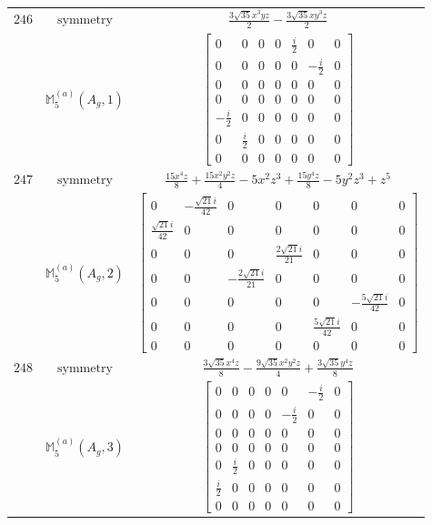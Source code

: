 \documentclass[fleqn,8pt,landscape]{jsarticle}
\begin{document}
\begin{longtable}{ccc}
$ 246 $ & $ \text{symmetry} $ & $ \frac{3 \sqrt{35} x^{3} y z}{2} - \frac{3 \sqrt{35} x y^{3} z}{2} $ \\
$  $ & $ \mathbb{M}_{5}^{(a)}(A_{g},1) $ & $ \begin{bmatrix} 0 & 0 & 0 & 0 & \frac{i}{2} & 0 & 0 \\ 0 & 0 & 0 & 0 & 0 & - \frac{i}{2} & 0 \\ 0 & 0 & 0 & 0 & 0 & 0 & 0 \\ 0 & 0 & 0 & 0 & 0 & 0 & 0 \\ - \frac{i}{2} & 0 & 0 & 0 & 0 & 0 & 0 \\ 0 & \frac{i}{2} & 0 & 0 & 0 & 0 & 0 \\ 0 & 0 & 0 & 0 & 0 & 0 & 0 \end{bmatrix} $ \\ \hline
$ 247 $ & $ \text{symmetry} $ & $ \frac{15 x^{4} z}{8} + \frac{15 x^{2} y^{2} z}{4} - 5 x^{2} z^{3} + \frac{15 y^{4} z}{8} - 5 y^{2} z^{3} + z^{5} $ \\
$  $ & $ \mathbb{M}_{5}^{(a)}(A_{g},2) $ & $ \begin{bmatrix} 0 & - \frac{\sqrt{21} i}{42} & 0 & 0 & 0 & 0 & 0 \\ \frac{\sqrt{21} i}{42} & 0 & 0 & 0 & 0 & 0 & 0 \\ 0 & 0 & 0 & \frac{2 \sqrt{21} i}{21} & 0 & 0 & 0 \\ 0 & 0 & - \frac{2 \sqrt{21} i}{21} & 0 & 0 & 0 & 0 \\ 0 & 0 & 0 & 0 & 0 & - \frac{5 \sqrt{21} i}{42} & 0 \\ 0 & 0 & 0 & 0 & \frac{5 \sqrt{21} i}{42} & 0 & 0 \\ 0 & 0 & 0 & 0 & 0 & 0 & 0 \end{bmatrix} $ \\ \hline
$ 248 $ & $ \text{symmetry} $ & $ \frac{3 \sqrt{35} x^{4} z}{8} - \frac{9 \sqrt{35} x^{2} y^{2} z}{4} + \frac{3 \sqrt{35} y^{4} z}{8} $ \\
$  $ & $ \mathbb{M}_{5}^{(a)}(A_{g},3) $ & $ \begin{bmatrix} 0 & 0 & 0 & 0 & 0 & - \frac{i}{2} & 0 \\ 0 & 0 & 0 & 0 & - \frac{i}{2} & 0 & 0 \\ 0 & 0 & 0 & 0 & 0 & 0 & 0 \\ 0 & 0 & 0 & 0 & 0 & 0 & 0 \\ 0 & \frac{i}{2} & 0 & 0 & 0 & 0 & 0 \\ \frac{i}{2} & 0 & 0 & 0 & 0 & 0 & 0 \\ 0 & 0 & 0 & 0 & 0 & 0 & 0 \end{bmatrix} $ \\ \hline

\end{longtable}
\end{document}
